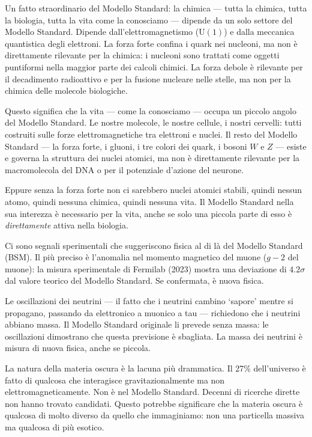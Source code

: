 \documentclass[12pt,a4paper,openany]{book}
\newcommand{\sezione}[1]{\vspace{1.2em}{\large\bfseries #1}\vspace{0.5em}\par}
\begin{document}
Un fatto straordinario del Modello Standard: la chimica --- tutta la chimica, tutta la biologia, tutta la vita come la conosciamo --- dipende da un solo settore del Modello Standard. Dipende dall'elettromagnetismo ($\mathrm{U}(1)$) e dalla meccanica quantistica degli elettroni. La forza forte confina i quark nei nucleoni, ma non è direttamente rilevante per la chimica: i nucleoni sono trattati come oggetti puntiformi nella maggior parte dei calcoli chimici. La forza debole è rilevante per il decadimento radioattivo e per la fusione nucleare nelle stelle, ma non per la chimica delle molecole biologiche.

Questo significa che la vita --- come la conosciamo --- occupa un piccolo angolo del Modello Standard. Le nostre molecole, le nostre cellule, i nostri cervelli: tutti costruiti sulle forze elettromagnetiche tra elettroni e nuclei. Il resto del Modello Standard --- la forza forte, i gluoni, i tre colori dei quark, i bosoni $W$ e $Z$ --- esiste e governa la struttura dei nuclei atomici, ma non è direttamente rilevante per la macromolecola del DNA o per il potenziale d'azione del neurone.

Eppure senza la forza forte non ci sarebbero nuclei atomici stabili, quindi nessun atomo, quindi nessuna chimica, quindi nessuna vita. Il Modello Standard nella sua interezza è necessario per la vita, anche se solo una piccola parte di esso è \textit{direttamente} attiva nella biologia.

\sezione{Oltre il Modello Standard: i segnali di nuova fisica}

Ci sono segnali sperimentali che suggeriscono fisica al di là del Modello Standard (BSM). Il più preciso è l'anomalia nel momento magnetico del muone ($g-2$ del muone): la misura sperimentale di Fermilab (2023) mostra una deviazione di $4.2\sigma$ dal valore teorico del Modello Standard. Se confermata, è nuova fisica.

Le oscillazioni dei neutrini --- il fatto che i neutrini cambino `sapore' mentre si propagano, passando da elettronico a muonico a tau --- richiedono che i neutrini abbiano massa. Il Modello Standard originale li prevede senza massa: le oscillazioni dimostrano che questa previsione è sbagliata. La massa dei neutrini è misura di nuova fisica, anche se piccola.

La natura della materia oscura è la lacuna più drammatica. Il 27\% dell'universo è fatto di qualcosa che interagisce gravitazionalmente ma non elettromagneticamente. Non è nel Modello Standard. Decenni di ricerche dirette non hanno trovato candidati. Questo potrebbe significare che la materia oscura è qualcosa di molto diverso da quello che immaginiamo: non una particella massiva ma qualcosa di più esotico.
\end{document}
